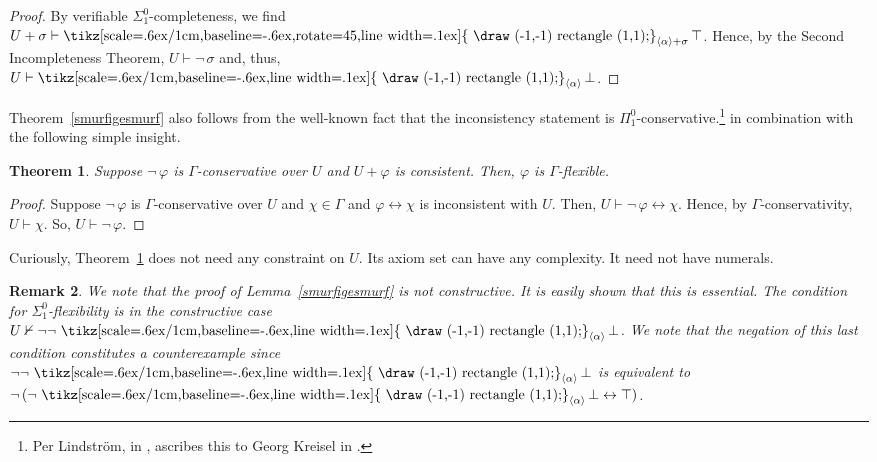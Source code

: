 \documentclass{amsart}
\newcommand{\qee} {\hspace*{2mm}\hfill \ding{109}}
\renewcommand{\iff}{\leftrightarrow}
\renewcommand{\phi}{\varphi}
\renewcommand{\Gamma}{\varGamma}
\newtheorem{theorem}{Theorem}[section]
\newtheorem{rem}[theorem]{Remark}
\newenvironment{remark}{\begin{rem} \rm}{\qee\end{rem}}
\DeclareMathOperator{\possible}{\text{\tikz[scale=.6ex/1cm,baseline=-.6ex,rotate=45,line width=.1ex]{
                            \draw (-1,-1) rectangle (1,1);}}}
\DeclareMathOperator{\necessary}{\text{\tikz[scale=.6ex/1cm,baseline=-.6ex,line width=.1ex]{
                            \draw (-1,-1) rectangle (1,1);}}}
\newcommand{\tupel}[1]{{\langle #1 \rangle}}
\newcommand{\apr}{{\vartriangle}}
\newcommand{\aco}{{\triangledown}}
\newcommand{\opr}{\necessary}
\newcommand{\oco}{\possible}
\begin{document}
\begin{proof}
By verifiable $\Sigma^0_1$-completeness,
we find $U+ \sigma \vdash \oco_{\tupel\alpha+\sigma} \top$. Hence, by the Second Incompleteness Theorem,
$U \vdash \neg\, \sigma$ and, thus, $U \vdash \opr_{\tupel\alpha} \bot$.
\end{proof}

Theorem~\ref{smurfigesmurf} also follows from the well-known fact that the inconsistency statement is
$\Pi^0_1$-conservative.\footnote{Per Lindstr\"om, in \cite[p94]{lind:aspe03}, ascribes this to Georg Kreisel in \cite{kreis:weak62}.} in combination with the following simple insight. 

\begin{theorem}\label{saaiesmurf}
Suppose $\neg\,\phi$ is $\Gamma$-conservative over $U$ and
$U + \phi$ is consistent. Then, $\phi$ is $\Gamma$-flexible.
\end{theorem}

\begin{proof}
Suppose $\neg\,\phi$ is $\Gamma$-conservative over $U$ and $\chi \in \Gamma$ and $\phi\iff \chi$ is inconsistent with $U$.
Then, $U \vdash \neg\,\phi \iff \chi$. Hence, by $\Gamma$-conservativity, $U \vdash \chi$. So, $U \vdash \neg\, \phi$.
\end{proof}

\noindent Curiously, Theorem~\ref{saaiesmurf} does not need any constraint on $U$. Its axiom set can have any complexity.
It need not have numerals.

\begin{remark}
{\footnotesize We note that the proof of Lemma~\ref{smurfigesmurf} is not constructive. It is easily shown that this is essential.
The condition for $\Sigma^0_1$-flexibility is in the constructive case $U \nvdash \neg\neg\,\opr_{\tupel\alpha}\bot$.
We note that the negation of this last condition constitutes a counterexample since  $\neg\neg\,\opr_{\tupel\alpha}\bot$
is equivalent to $\neg\, (\neg\,\opr_{\tupel\alpha}\bot \iff \top)$.}
\end{remark}

%
\end{document}

